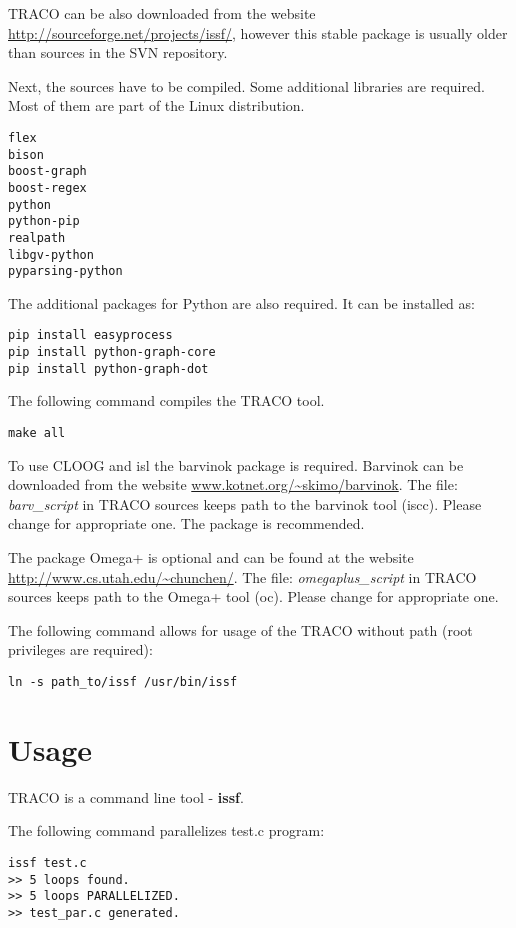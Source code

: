 \documentclass[a4paper,12pt]{book}
\begin{document}
TRACO can be also downloaded from the website \url{http://sourceforge.net/projects/issf/}, however this stable package is 
usually older than sources in the SVN repository. 

Next, the sources have to be compiled. Some additional libraries are required. Most of them are part of the Linux distribution.
\begin{verbatim}
flex
bison
boost-graph
boost-regex
python
python-pip
realpath
libgv-python
pyparsing-python
\end{verbatim}

The additional packages for Python are also required. It can be installed as:

\begin{verbatim}
pip install easyprocess
pip install python-graph-core
pip install python-graph-dot
\end{verbatim}

The following command compiles the TRACO tool.

\begin{verbatim}
make all
\end{verbatim}

To use CLOOG \cite{cloog} and isl \cite{isl} the barvinok package is required. Barvinok can be downloaded
from the website \url{www.kotnet.org/~skimo/barvinok}. The file: \textit{barv\_script} in TRACO sources keeps path to the barvinok tool (iscc). Please change for appropriate one. The package is recommended.

The package Omega+ is optional and can be found at the website \url{http://www.cs.utah.edu/~chunchen/}. The file: \textit{omegaplus\_script} in TRACO sources keeps path to the Omega+ tool (oc). Please change for appropriate one. 

The following command allows for usage of the TRACO without path (root privileges are required):

\begin{verbatim}
ln -s path_to/issf /usr/bin/issf
\end{verbatim}


\section{Usage}

TRACO is a command line tool - \textbf{issf}.

The following command parallelizes test.c program:

\begin{verbatim}
issf test.c 
>> 5 loops found.
>> 5 loops PARALLELIZED.
>> test_par.c generated.
\end{verbatim}
\end{document}
